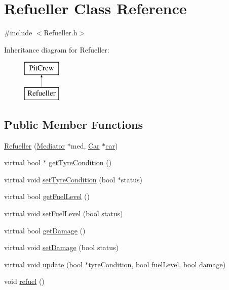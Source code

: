 \hypertarget{class_refueller}{}\section{Refueller Class Reference}
\label{class_refueller}


{\ttfamily \#include $<$Refueller.\+h$>$}

Inheritance diagram for Refueller\+:\begin{figure}[H]
\begin{center}
\leavevmode
\includegraphics[height=2.000000cm]{class_refueller}
\end{center}
\end{figure}
\subsection*{Public Member Functions}
\begin{DoxyCompactItemize}
\item 
\mbox{\hyperlink{class_refueller_aa9bba16400033baf27cd554c58021ddc}{Refueller}} (\mbox{\hyperlink{class_mediator}{Mediator}} $\ast$med, \mbox{\hyperlink{class_car}{Car}} $\ast$\mbox{\hyperlink{class_pit_crew_ae2d97d82c1ae7061faf9b053329772e5}{car}})
\item 
virtual bool $\ast$ \mbox{\hyperlink{class_refueller_a4ccfe56b7f490244776856fc5b8c0d45}{get\+Tyre\+Condition}} ()
\item 
virtual void \mbox{\hyperlink{class_refueller_a7260c4594e1def9110d293186a9dc14c}{set\+Tyre\+Condition}} (bool $\ast$status)
\item 
virtual bool \mbox{\hyperlink{class_refueller_afa17784be5e98b518c3a7de2d3b7ad1f}{get\+Fuel\+Level}} ()
\item 
virtual void \mbox{\hyperlink{class_refueller_a8b8eb7429509e858a3787e1a58aa9db0}{set\+Fuel\+Level}} (bool status)
\item 
virtual bool \mbox{\hyperlink{class_refueller_a60e223f847141196f4b44656869b06d1}{get\+Damage}} ()
\item 
virtual void \mbox{\hyperlink{class_refueller_a0b40ac4e5bd3c83e2a0cfd18214c849d}{set\+Damage}} (bool status)
\item 
virtual void \mbox{\hyperlink{class_refueller_a61a9f440ae2e7ca694b40b03a6a7b8d6}{update}} (bool $\ast$\mbox{\hyperlink{class_pit_crew_add6d2560b553a1359bfb68a6a4d80332}{tyre\+Condition}}, bool \mbox{\hyperlink{class_pit_crew_ad45840fa02b11a128e069ffcc7fdde47}{fuel\+Level}}, bool \mbox{\hyperlink{class_pit_crew_aa87241e1f87a430e1a92ed7010ccf554}{damage}})
\item 
void \mbox{\hyperlink{class_refueller_a92e905b0ad944ff18ee9689eb0d39c95}{refuel}} ()
\end{DoxyCompactItemize}
